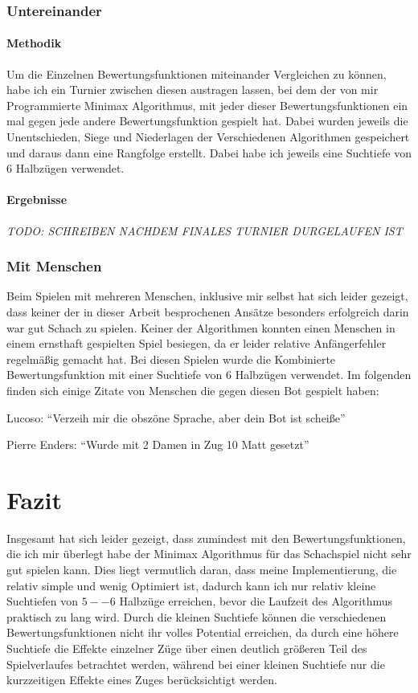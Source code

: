 \documentclass[12pt, a4paper, oneside, openright]{article}
\begin{document}
\subsubsection{Untereinander}\label{subsubsec:untereinander}
\paragraph{Methodik}
Um die Einzelnen Bewertungsfunktionen miteinander Vergleichen zu können, habe ich ein Turnier zwischen diesen austragen lassen, bei dem der von mir Programmierte Minimax Algorithmus, mit jeder dieser Bewertungsfunktionen ein mal gegen jede andere Bewertungsfunktion gespielt hat.
Dabei wurden jeweils die Unentschieden, Siege und Niederlagen der Verschiedenen Algorithmen gespeichert und daraus dann eine Rangfolge erstellt.
Dabei habe ich jeweils eine Suchtiefe von 6 Halbzügen verwendet.
\paragraph{Ergebnisse}
\emph{TODO: SCHREIBEN NACHDEM FINALES TURNIER DURGELAUFEN IST}
\subsubsection{Mit Menschen}\label{subsubsec:mit menschen}
Beim Spielen mit mehreren Menschen, inklusive mir selbst hat sich leider gezeigt, dass keiner der in dieser Arbeit besprochenen Ansätze besonders erfolgreich darin war gut Schach zu spielen.
Keiner der Algorithmen konnten einen Menschen in einem ernsthaft gespielten Spiel besiegen, da er leider relative Anfängerfehler regelmäßig gemacht hat.
Bei diesen Spielen wurde die Kombinierte Bewertungsfunktion mit einer Suchtiefe von 6 Halbzügen verwendet.
Im folgenden finden sich einige Zitate von Menschen die gegen diesen Bot gespielt haben:

Lucoso: \enquote{Verzeih mir die obszöne Sprache, aber dein Bot ist scheiße}

Pierre Enders: \enquote{Wurde mit 2 Damen in Zug 10 Matt gesetzt}



\section{Fazit}\label{sec:fazit}
Insgesamt hat sich leider gezeigt, dass zumindest mit den Bewertungsfunktionen, die ich mir überlegt habe der Minimax Algorithmus für das Schachspiel nicht sehr gut spielen kann.
Dies liegt vermutlich daran, dass meine Implementierung, die relativ simple und wenig Optimiert ist, dadurch kann ich nur relativ kleine Suchtiefen von $5--6$ Halbzüge erreichen, bevor die Laufzeit des Algorithmus praktisch zu lang wird.
Durch die kleinen Suchtiefe können die verschiedenen Bewertungsfunktionen nicht ihr volles Potential erreichen, da durch eine höhere Suchtiefe die Effekte einzelner Züge über einen deutlich größeren Teil des Spielverlaufes betrachtet werden, während bei einer kleinen Suchtiefe nur die kurzzeitigen Effekte eines Zuges berücksichtigt werden.
\newpage
\end{document}
